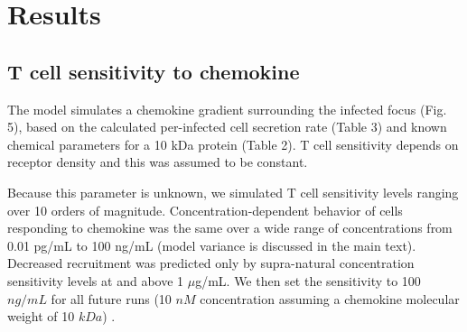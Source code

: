 \documentclass[preprint,10pt,authoryear]{article}
\newcommand{\removed}[1]{{\color{dkred}\sout{#1}}}
\newcommand{\fred}[1]{{\color{dkblue}#1}}
\begin{document}
%


\section{Results}


\subsection{T cell sensitivity to chemokine}

The model simulates a chemokine gradient surrounding the infected focus (Fig. 5), based on the calculated per-infected cell secretion rate (Table 3) and known chemical parameters for a 10 kDa protein (Table 2).  T cell sensitivity depends on receptor density \citep{Desmetz2006} and this was assumed to be constant.

Because this parameter is unknown, we simulated T cell sensitivity levels ranging over 10 orders of magnitude.  Concentration-dependent behavior of cells responding to chemokine was the same over a wide range of concentrations from 0.01 pg/mL to 100 ng/mL (model variance is discussed in the main text).  Decreased recruitment was predicted only by supra-natural concentration sensitivity levels at and above 1 $\mu$g/mL.  We then set the sensitivity to 100 $ng/mL$ for all future runs (10 $nM$ concentration assuming a chemokine molecular weight of 10 $kDa$) \citep{Gao2003}.  
\end{document}
